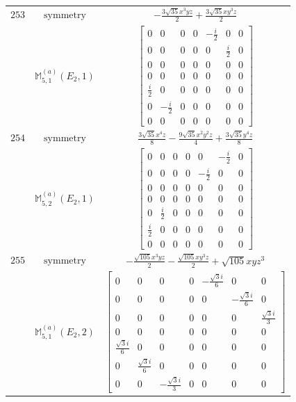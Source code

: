 \documentclass[fleqn,8pt,landscape]{jsarticle}
\begin{document}
\begin{longtable}{ccc}
$ 253 $ & $ \text{symmetry} $ & $ - \frac{3 \sqrt{35} x^{3} y z}{2} + \frac{3 \sqrt{35} x y^{3} z}{2} $ \\
$  $ & $ \mathbb{M}_{5,1}^{(a)}(E_{2},1) $ & $ \begin{bmatrix} 0 & 0 & 0 & 0 & - \frac{i}{2} & 0 & 0 \\ 0 & 0 & 0 & 0 & 0 & \frac{i}{2} & 0 \\ 0 & 0 & 0 & 0 & 0 & 0 & 0 \\ 0 & 0 & 0 & 0 & 0 & 0 & 0 \\ \frac{i}{2} & 0 & 0 & 0 & 0 & 0 & 0 \\ 0 & - \frac{i}{2} & 0 & 0 & 0 & 0 & 0 \\ 0 & 0 & 0 & 0 & 0 & 0 & 0 \end{bmatrix} $ \\ \hline
$ 254 $ & $ \text{symmetry} $ & $ \frac{3 \sqrt{35} x^{4} z}{8} - \frac{9 \sqrt{35} x^{2} y^{2} z}{4} + \frac{3 \sqrt{35} y^{4} z}{8} $ \\
$  $ & $ \mathbb{M}_{5,2}^{(a)}(E_{2},1) $ & $ \begin{bmatrix} 0 & 0 & 0 & 0 & 0 & - \frac{i}{2} & 0 \\ 0 & 0 & 0 & 0 & - \frac{i}{2} & 0 & 0 \\ 0 & 0 & 0 & 0 & 0 & 0 & 0 \\ 0 & 0 & 0 & 0 & 0 & 0 & 0 \\ 0 & \frac{i}{2} & 0 & 0 & 0 & 0 & 0 \\ \frac{i}{2} & 0 & 0 & 0 & 0 & 0 & 0 \\ 0 & 0 & 0 & 0 & 0 & 0 & 0 \end{bmatrix} $ \\ \hline
$ 255 $ & $ \text{symmetry} $ & $ - \frac{\sqrt{105} x^{3} y z}{2} - \frac{\sqrt{105} x y^{3} z}{2} + \sqrt{105} x y z^{3} $ \\
$  $ & $ \mathbb{M}_{5,1}^{(a)}(E_{2},2) $ & $ \begin{bmatrix} 0 & 0 & 0 & 0 & - \frac{\sqrt{3} i}{6} & 0 & 0 \\ 0 & 0 & 0 & 0 & 0 & - \frac{\sqrt{3} i}{6} & 0 \\ 0 & 0 & 0 & 0 & 0 & 0 & \frac{\sqrt{3} i}{3} \\ 0 & 0 & 0 & 0 & 0 & 0 & 0 \\ \frac{\sqrt{3} i}{6} & 0 & 0 & 0 & 0 & 0 & 0 \\ 0 & \frac{\sqrt{3} i}{6} & 0 & 0 & 0 & 0 & 0 \\ 0 & 0 & - \frac{\sqrt{3} i}{3} & 0 & 0 & 0 & 0 \end{bmatrix} $ \\ \hline

\end{longtable}
\end{document}
